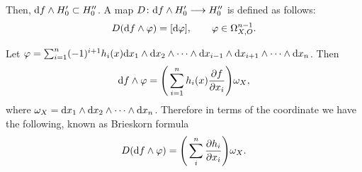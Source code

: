 \documentclass[10pt,a4paper]{amsart}
\numberwithin{equation}{section}
\begin{document}
Then, ${\rm d}f\wedge H_{0}^{\prime} \subset H_{0}^{\prime\prime}$.
A map $D\colon {\rm d}f\wedge H_{0}^{\prime} \longrightarrow H_{0}^{\prime\prime} $ is defined as follows:
\begin{gather*}
D({\rm d}f\wedge \varphi) = [{\rm d}\varphi], \qquad \varphi \in \Omega_{X,O}^{n-1}.
\end{gather*}

Let $ \varphi= \sum_{i=1}^{n} (-1)^{i+1}h_i(x){\rm d}x_1 \wedge {\rm d}x_2 \wedge \cdots \wedge {\rm d}x_{i-1} \wedge {\rm d}x_{i+1} \wedge \cdots \wedge {\rm d}x_n$. Then
\begin{gather*}
{\rm d}f\wedge \varphi = \Bigg(\sum_{i=1}^{n} h_i(x)\frac{\partial f}{\partial x_i}\Bigg) \omega_X,
\end{gather*}
where $ \omega_X={\rm d}x_1\wedge {\rm d}x_2 \wedge \cdots \wedge {\rm d}x_n$. Therefore in terms of the coordinate we have the following, known as Brieskorn formula
\begin{gather*}
D({\rm d}f\wedge \varphi) = \Bigg(\sum_{i}^{n} \frac{\partial h_i}{\partial x_i}\Bigg)\omega_X.
\end{gather*}
\end{document}
